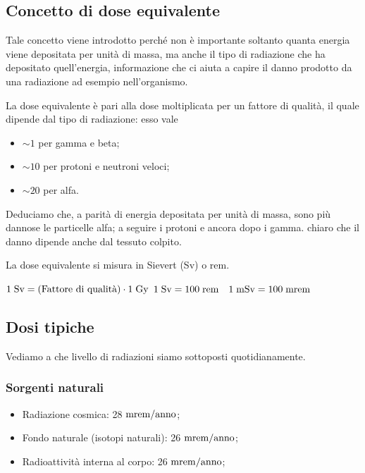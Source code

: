 \subsection{Concetto di dose equivalente}
Tale concetto viene introdotto perché non è importante soltanto quanta energia viene depositata per unità di massa, ma anche il tipo di radiazione che ha depositato quell'energia, informazione che ci aiuta a capire il danno prodotto da una radiazione ad esempio nell'organismo.

La dose equivalente è pari alla dose moltiplicata per un fattore di qualità, il quale dipende dal tipo di radiazione: esso vale
\begin{itemize}
    \item $\sim 1$ per gamma e beta;
    \item $\sim 10$ per protoni e neutroni veloci;
    \item $\sim 20$ per alfa.
\end{itemize}
Deduciamo che, a parità di energia depositata per unità di massa, sono più dannose le particelle alfa; a seguire i protoni e ancora dopo i gamma. \E chiaro che il danno dipende anche dal tessuto colpito.

La dose equivalente si misura in Sievert (Sv) o rem.

$\rm 1 \; Sv=(\text{Fattore di qualità}) \cdot 1 \; Gy$
$\rm 1 \; Sv=100 \; rem \quad 1 \; mSv=100 \; mrem$

\subsection{Dosi tipiche}

Vediamo a che livello di radiazioni siamo sottoposti quotidianamente.

\subsubsection{Sorgenti naturali}

\begin{itemize}
    \item Radiazione cosmica: 28 $\rm mrem/anno$;
    \item Fondo naturale (isotopi naturali): 26 $\rm mrem/anno$;
    \item Radioattività interna al corpo\footnotemark: 26 $\rm mrem/anno$;
\end{itemize}


